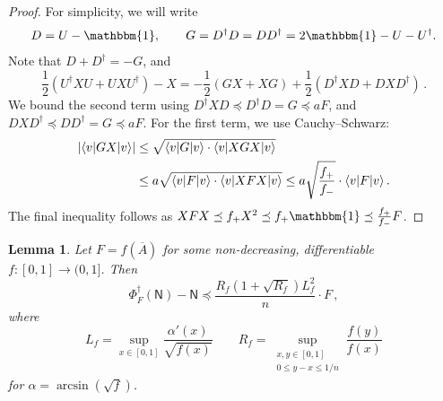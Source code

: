 \documentclass[10pt]{article}
\DeclarePairedDelimiter{\bra}{\langle}{\rvert}%
\DeclarePairedDelimiter{\ket}{\lvert}{\rangle}%
\newcommand{\luders}{\Phi}
\newcommand{\Id}{\mathbbm{1}}
\newtheorem{lemma}[theorem]{Lemma}
\newcommand{\lift}[1]{\overline{#1}}
\begin{document}
\begin{proof}
    For simplicity, we will write
    \begin{equation*}
        D = U - \Id,
        \qquad
        G = D^{\dagger}D = DD^{\dagger}
        = 2\Id - U - U^{\dagger}.
    \end{equation*}
    Note that $D + D^\dagger = -G$, and
    \begin{equation}
        \frac{1}{2}(U^\dagger X U + UXU^\dagger) - X = -\frac{1}{2}(GX + XG) + \frac{1}{2}(D^\dagger XD + DXD^\dagger)\,.
    \end{equation}
    We bound the second term using $D^\dagger XD \preceq D^\dagger D = G \preceq aF$, and $DXD^\dagger \preceq DD^\dagger = G \preceq aF$. For the first term, we use Cauchy--Schwarz:
    \begin{align}
        |\bra{v}GX\ket{v}|
        &\le \sqrt{\bra{v}G\ket{v}\cdot \bra{v}XGX\ket{v}} \\
        &\le a\sqrt{\bra{v}F\ket{v}\cdot \bra{v}XFX\ket{v}}
        \le a\sqrt{\frac{f_+}{f_-}} \cdot \bra{v} F\ket{v}
        \,.
    \end{align}
    The final inequality follows as $XFX \preceq f_+ X^2 \preceq f_+\Id \preceq \frac{f_+}{f_-}F$.
\end{proof}

\begin{lemma}\label{lem:heating}
    Let $F = f(\lift{A})$ for some non-decreasing, differentiable $f: [0,1]\to(0,1]$. Then
    \begin{equation}
        \luders^\dagger_F(\mathsf{N}) - \mathsf{N} \preceq \frac{R_f(1 + \sqrt{R_f})L^2_f}{n}\cdot F\,,
    \end{equation}
    where
    \begin{equation}
        L_f = \sup_{x\in[0,1]} \frac{\alpha'(x)}{\sqrt{f(x)}} \qquad R_f = \sup_{\substack{x,y\in[0,1] \\ 0 \le y - x \le 1/n}} \frac{f(y)}{f(x)}
    \end{equation}
    for $\alpha = \arcsin(\sqrt{f})$.
\end{lemma}
\end{document}
